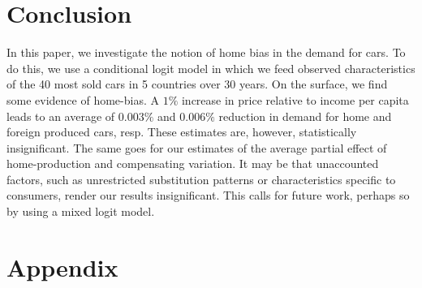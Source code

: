 \documentclass[11pt]{article}
\renewcommand{\baselinestretch}{1.5}
\begin{document}
\section{Conclusion}
In this paper, we investigate the notion of home bias in the demand for cars. To do this, we use a conditional logit model in which we feed observed characteristics of the 40 most sold cars in 5 countries over 30 years. On the surface, we find some evidence of home-bias. A $1\%$ increase in price relative to income per capita leads to an average of $0.003\%$ and $0.006\%$ reduction in demand for home and foreign produced cars, resp. These estimates are, however, statistically insignificant. The same goes for our estimates of the average partial effect of home-production and compensating variation. It may be that unaccounted factors, such as unrestricted substitution patterns or characteristics specific to consumers, render our results insignificant. This calls for future work, perhaps so by using a mixed logit model.


\newpage
\begin{small}
\renewcommand{\baselinestretch}{1.15}

\end{small}

\newpage
\appendix
\renewcommand*\thefigure{\Alph{section}.\arabic{figure}}
\renewcommand*\thetable{\Alph{section}.\arabic{table}}
\section{Appendix}
\end{document}
